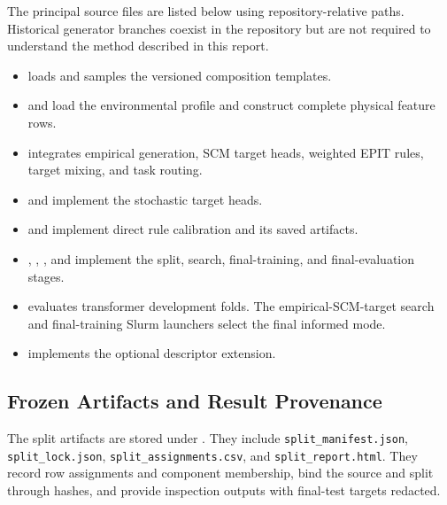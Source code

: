 \documentclass{article}
\begin{document}
The principal source files are listed below using repository-relative paths.
Historical generator branches coexist in the repository but are not required
to understand the method described in this report.
\begin{itemize}
    \item {} loads and
    samples the versioned composition templates.
    \item {} and
     load the environmental
    profile and construct complete physical feature rows.
    \item {} integrates empirical generation,
    SCM target heads, weighted EPIT rules, target mixing, and task routing.
    \item {} and
     implement the stochastic target heads.
    \item {} and
     implement direct
    rule calibration and its saved artifacts.
    \item {},
    ,
    , and
     implement the split,
    search, final-training, and final-evaluation stages.
    \item {} evaluates
    transformer development folds. The empirical-SCM-target search and
    final-training Slurm launchers select the final informed mode.
    \item {} implements the optional
    descriptor extension.
\end{itemize}

\subsection{Frozen Artifacts and Result Provenance}

The split artifacts are stored under
.
They include \texttt{split\_manifest.json}, \texttt{split\_lock.json},
\texttt{split\_assignments.csv}, and \texttt{split\_report.html}. They record
row assignments and component membership, bind the source and split through
hashes, and provide inspection outputs with final-test targets redacted.
\end{document}
